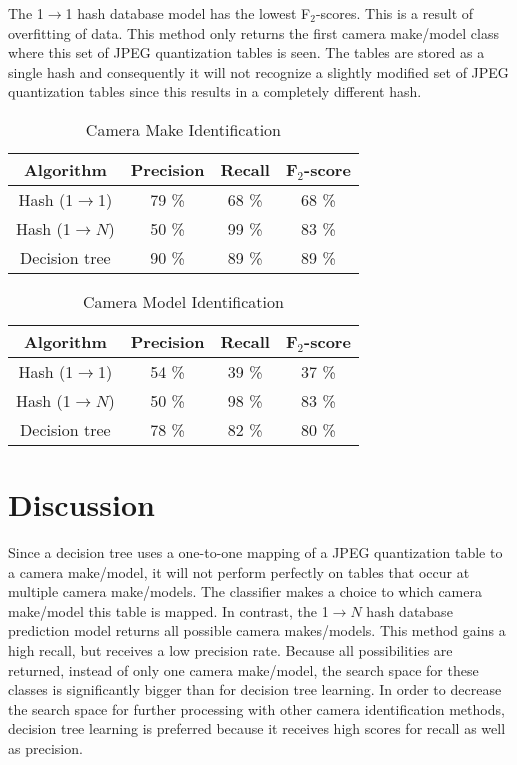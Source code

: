 The 1$\rightarrow$1 hash database model has the lowest F$_2$-scores. This is a result of overfitting of data. This method only returns the first camera make/model class where this set of JPEG quantization tables is seen. The tables are stored as a single hash and consequently it will not recognize a slightly modified set of JPEG quantization tables since this results in a completely different hash.

\begin{table}[h]
\begin{center}

\begin{tabular}{| c| c| c| c|}
\hline
Algorithm & Precision & Recall & F$_2$-score\\
\hline
Hash (1$\rightarrow$1) & 79 \% & 68 \% & 68 \%\\
Hash (1$\rightarrow N$) & 50 \% & 99 \% & 83 \%\\
Decision tree & 90 \% & 89 \% & 89 \% \\
\hline
\end{tabular}
\caption{Camera Make Identification}
\label{tab:fscore_make}
\end{center}

\end{table}

\begin{table}[h]
\begin{center}
\begin{tabular}{| c| c| c| c|}
\hline
Algorithm & Precision & Recall & F$_2$-score\\
\hline
Hash (1$\rightarrow$1) & 54 \% & 39 \% & 37 \%\\
Hash (1$\rightarrow N$) & 50 \% & 98 \% & 83 \%\\
Decision tree & 78 \% & 82 \% & 80 \% \\
\hline
\end{tabular}
\caption{Camera Model Identification}
\label{tab:fscore_model}
\end{center}

\end{table}


\section{Discussion}

Since a decision tree uses a one-to-one mapping of a JPEG quantization table to a camera make/model, it will not perform perfectly on tables that occur at multiple camera make/models. The classifier makes a choice to which camera make/model this table is mapped. In contrast, the 
1$\rightarrow N$ hash database prediction model returns all possible camera makes/models. This method gains a high recall, but receives a low precision rate. Because all possibilities are returned, instead of only one camera make/model, the search space for these classes is significantly bigger than for decision tree learning. In order to decrease the search space for further processing with other camera identification methods, decision tree learning is preferred because it receives high scores for recall as well as precision.

